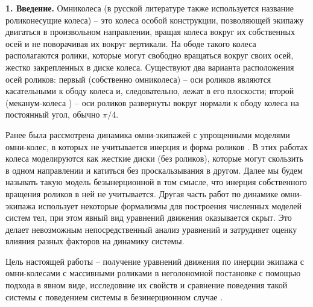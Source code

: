 {\bf 1. Введение.}
Омниколеса (в русской литературе также используется название роликонесущие колеса) -- это колеса особой конструкции, позволяющей экипажу двигаться в произвольном направлении, вращая колеса вокруг их собственных осей и не поворачивая их вокруг вертикали. На ободе такого колеса располагаются ролики, которые могут свободно вращаться вокруг своих осей, жестко закрепленных в диске колеса. Существуют два варианта расположения осей роликов: первый  (собственно омниколеса) -- оси роликов являются касательными к ободу колеса и, следовательно, лежат в его плоскости; второй (меканум-колеса \cite{mecanum}) -- оси роликов развернуты вокруг нормали к ободу колеса на постоянный угол, обычно $\pi/4$.

Ранее была рассмотрена динамика омни-экипажей с упрощенными моделями омни-колес, в которых не учитывается инерция и форма роликов \cite{ZobovaTatarinovPMM, formalskii, borisov, ZobovaTatarinovAspecty2006, zobova2008svobodnye8020851, Martynenko2010}. В этих работах колеса моделируются как жесткие диски (без роликов), которые могут скользить в одном направлении и катиться без проскальзывания в другом. Далее мы будем называть такую модель безынерционной в том смысле, что инерция собственного вращения роликов в ней не учитывается. Другая часть работ по динамике омни-экипажа \cite{KosenkoGerasimov, Tobolar, Williams2002, Ashmore2002} использует некоторые формализмы для построения численных моделей систем тел, при этом явный вид уравнений движения оказывается скрыт. Это делает невозможным непосредственный  анализ уравнений и затрудняет оценку влияния разных факторов на динамику системы.


Цель настоящей работы -- получение уравнений движения по инерции экипажа с омни-колесами с массивными роликами в неголономной постановке с помощью подхода \cite{Tatarinov} в явном виде, исследовние их свойств и сравнение поведения такой системы с поведением системы в безинерционном случае \cite{Zobova2011}.